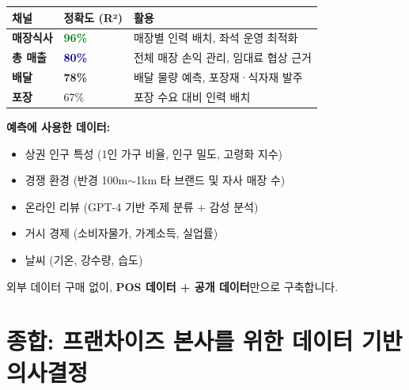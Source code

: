 \documentclass[11pt, a4paper]{article}
\begin{document}
\begin{table}[H]
\centering
\renewcommand{\arraystretch}{1.3}
\large
\begin{tabular}{L{4cm} C{3cm} L{7cm}}
\toprule
{} \textbf{채널} & \textbf{정확도 (R²)} & \textbf{활용} \\
\midrule
\textbf{매장식사} & \textcolor{green}{\textbf{96\%}} & 매장별 인력 배치, 좌석 운영 최적화 \\[4pt]
\textbf{총 매출} & \textcolor{darkblue}{\textbf{80\%}} & 전체 매장 손익 관리, 임대료 협상 근거 \\[4pt]
\textbf{배달} & \textbf{78\%} & 배달 물량 예측, 포장재·식자재 발주 \\[4pt]
\textbf{포장} & 67\% & 포장 수요 대비 인력 배치 \\
\bottomrule
\end{tabular}
\end{table}

\textbf{예측에 사용한 데이터:}
\begin{itemize}[itemsep=3pt, leftmargin=2em]
  \item 상권 인구 특성 (1인 가구 비율, 인구 밀도, 고령화 지수)
  \item 경쟁 환경 (반경 100m$\sim$1km 타 브랜드 및 자사 매장 수)
  \item 온라인 리뷰 (GPT-4 기반 주제 분류 + 감성 분석)
  \item 거시 경제 (소비자물가, 가계소득, 실업률)
  \item 날씨 (기온, 강수량, 습도)
\end{itemize}

외부 데이터 구매 없이, \textbf{POS 데이터 + 공개 데이터}만으로 구축합니다.

\newpage

\section{종합: 프랜차이즈 본사를 위한 데이터 기반 의사결정}
\end{document}
